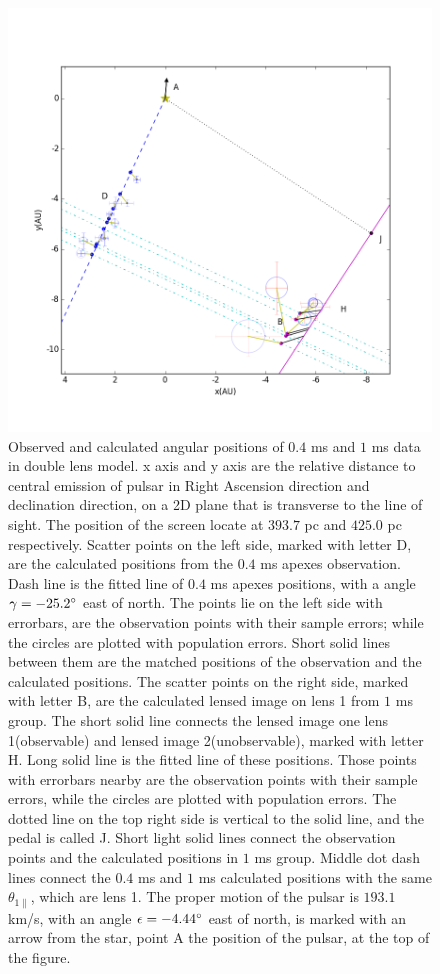 \documentclass[useAMS,usenatbib]{mn2e}
\begin{document}
\begin{figure}
\centering
\includegraphics[width=1.0\textwidth, angle=0]{Double_lens_xy.png}
\caption{Observed and calculated angular positions of $0.4$ ms and $1$ ms data in double lens model. x axis and y axis are the relative distance to central emission of pulsar in Right Ascension direction and declination direction, on a 2D plane that is transverse to the line of sight. The position of the screen locate at $393.7$ pc and $425.0$ pc respectively. Scatter points on the left side, marked with letter D, are the calculated positions from the $0.4$ ms apexes observation. Dash line is the fitted line of $0.4$ ms apexes positions, with a angle $\gamma=-25.2\degree$  east of north. The points lie on the left side with errorbars, are the observation points with their sample errors; while the circles are plotted with population errors. Short solid lines between them are the matched positions of the observation and the calculated positions. The scatter points on the right side, marked with letter B, are the calculated lensed image on lens 1 from $1$ ms group. The short solid line connects the lensed image one lens 1(observable) and lensed image 2(unobservable), marked with letter H. Long solid line is the fitted line of these positions. Those points with errorbars nearby are the observation points with their sample errors, while the circles are plotted with population errors. The dotted line on the top right side is vertical to the solid line, and the pedal is called J. Short light solid lines connect the observation points and the calculated positions in $1$ ms group. Middle dot dash lines connect the $0.4$ ms and $1$ ms calculated positions with the same $\theta_{1\parallel}$, which are lens 1. The proper motion of the pulsar is $193.1$ km/s, with an angle $\epsilon=-4.44\degree$ east of north, is marked with an arrow from the star, point A the position of the pulsar, at the top of the figure.}
\label{Doublelens}
\end{figure}
\end{document}
